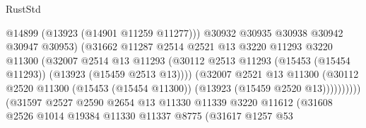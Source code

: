 \begin{lexlean}{RustStd}
\begin{coremodule}
                                            @14899
                                            (@13923 (@14901 @11259 @11277)))
                                          @30932
                                          @30935
                                          @30938
                                          @30942
                                          @30947
                                          @30953)
                                        (@31662
                                          @11287
                                          @2514
                                          @2521
                                          @13
                                          @3220
                                          @11293
                                          @3220
                                          @11300
                                          (@32007
                                            @2514
                                            @13
                                            @11293
                                            (@30112
                                              @2513
                                              @11293
                                              (@15453 (@15454 @11293))
                                              (@13923 (@15459 @2513 @13))))
                                          (@32007
                                            @2521
                                            @13
                                            @11300
                                            (@30112
                                              @2520
                                              @11300
                                              (@15453 (@15454 @11300))
                                              (@13923 (@15459 @2520 @13))))))))))
                              (@31597
                                @2527
                                @2590
                                @2654
                                @13
                                @11330
                                @11339
                                @3220
                                @11612
                                (@31608
                                  @2526
                                  @1014
                                  @19384
                                  @11330
                                  @11337
                                  @8775
                                  (@31617
                                    @1257
                                    @53

\end{coremodule}
\end{lexlean}
